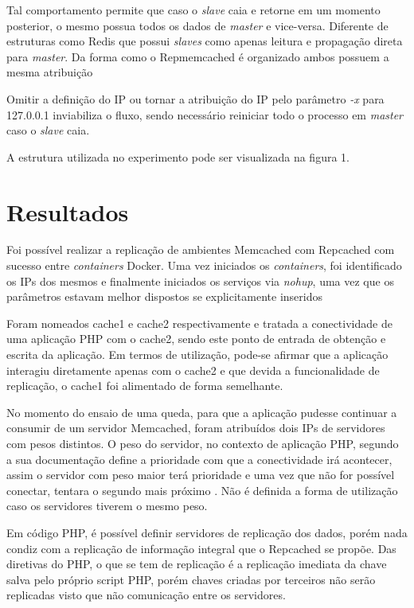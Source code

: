 \documentclass[conference]{IEEEtran}
\begin{document}
Tal comportamento permite que caso o \textit{slave} caia e retorne em um momento posterior, o mesmo possua todos os dados de \textit{master} e vice-versa. Diferente de estruturas como Redis que possui \textit{slaves} como apenas leitura e propagação direta para \textit{master}. Da forma como o Repmemcached é organizado ambos possuem a mesma atribuição

Omitir a definição do IP ou tornar a atribuição do IP pelo parâmetro \textit{-x} para 127.0.0.1 inviabiliza o fluxo, sendo necessário reiniciar todo o processo em \textit{master} caso o \textit{slave} caia.

A estrutura utilizada no experimento pode ser visualizada na figura 1.

\section{Resultados} 

Foi possível realizar a replicação de ambientes Memcached com Repcached com sucesso entre \textit{containers} Docker. Uma vez iniciados os \textit{containers}, foi identificado os IPs dos mesmos e finalmente iniciados os serviços via \textit{nohup}, uma vez que os parâmetros estavam melhor dispostos se explicitamente inseridos

Foram nomeados cache1 e cache2 respectivamente e tratada a conectividade de uma aplicação PHP com o cache2, sendo este ponto de entrada de obtenção e escrita da aplicação. Em termos de utilização, pode-se afirmar que a aplicação interagiu diretamente apenas com o cache2 e que devida a funcionalidade de replicação, o cache1 foi alimentado de forma semelhante.

No momento do ensaio de uma queda, para que a aplicação pudesse continuar a consumir de um servidor Memcached, foram atribuídos dois IPs de servidores com pesos distintos. O peso do servidor, no contexto de aplicação PHP, segundo a sua documentação define a prioridade com que a conectividade irá acontecer, assim o servidor com peso maior terá prioridade e uma vez que não for possível conectar, tentara o segundo mais próximo \cite{phpmemcachedserver}. Não é definida a forma de utilização caso os servidores tiverem o mesmo peso.

Em código PHP, é possível definir servidores de replicação dos dados, porém nada condiz com a replicação de informação integral que o Repcached se propõe. Das diretivas do PHP, o que se tem de replicação é a replicação imediata da chave salva pelo próprio script PHP, porém chaves criadas por terceiros não serão replicadas visto que não comunicação entre os servidores.
\end{document}
